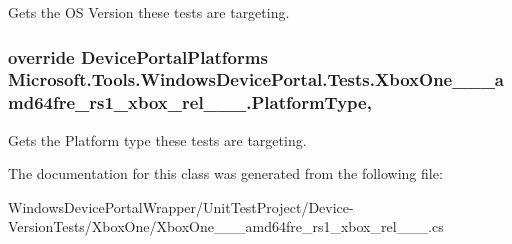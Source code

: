 Gets the OS Version these tests are targeting. 

\subsubsection[{\texorpdfstring{Platform\+Type}{PlatformType}}]{\setlength{\rightskip}{0pt plus 5cm}override Device\+Portal\+Platforms Microsoft.\+Tools.\+Windows\+Device\+Portal.\+Tests.\+Xbox\+One\+\_\+\_\+\_\+amd64fre\+\_\+rs1\+\_\+xbox\+\_\+rel\+\_\+\_\+\_.\+Platform\+Type\hspace{0.3cm}{\ttfamily [get]}, {\ttfamily [protected]}}\hypertarget{class_microsoft_1_1_tools_1_1_windows_device_portal_1_1_tests_1_1_xbox_one__14385__1002__amd64frd9599e6105747a2dd5ce5cbe798a705b_a7e178fcece4e5ccc58fd676d65f43f0f}{}\label{class_microsoft_1_1_tools_1_1_windows_device_portal_1_1_tests_1_1_xbox_one__14385__1002__amd64frd9599e6105747a2dd5ce5cbe798a705b_a7e178fcece4e5ccc58fd676d65f43f0f}


Gets the Platform type these tests are targeting. 



The documentation for this class was generated from the following file\+:\begin{DoxyCompactItemize}
\item 
Windows\+Device\+Portal\+Wrapper/\+Unit\+Test\+Project/\+Device-\/\+Version\+Tests/\+Xbox\+One/Xbox\+One\+\_\+\_\+\_\+amd64fre\+\_\+rs1\+\_\+xbox\+\_\+rel\+\_\+\_\+\_.\+cs\end{DoxyCompactItemize}
